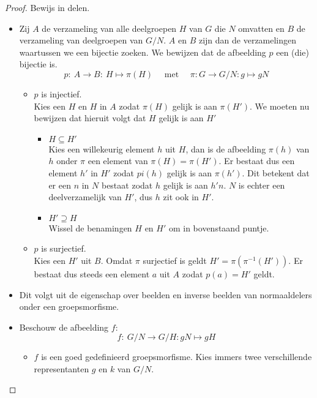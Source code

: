 \documentclass[main.tex]{subfiles}
\begin{document}
\begin{st}
  \begin{proof}
    Bewijs in delen.
    \begin{itemize}
    \item
      Zij $A$ de verzameling van alle deelgroepen $H$ van $G$ die $N$ omvatten en $B$ de verzameling van deelgroepen van $G/N$.
      $A$ en $B$ zijn dan de verzamelingen waartussen we een bijectie zoeken.
      We bewijzen dat de afbeelding $p$ een (die) bijectie is.
      \[ p:\ A \rightarrow B:\ H \mapsto \pi(H) \quad\text{ met }\quad \pi: G \rightarrow G/N: g \mapsto gN \]
      \begin{itemize}
      \item $p$ is injectief.\\
        Kies een $H$ en $H$ in $A$ zodat $\pi(H)$ gelijk is aan $\pi(H')$.
        We moeten nu bewijzen dat hieruit volgt dat $H$ gelijk is aan $H'$
        \begin{itemize}
        \item $H \subseteq H'$\\
          Kies een willekeurig element $h$ uit $H$, dan is de afbeelding $\pi(h)$ van $h$ onder $\pi$ een element van $\pi(H) = \pi(H')$.
          Er bestaat dus een element $h'$ in $H'$ zodat $pi(h)$ gelijk is aan $\pi(h')$.
          Dit betekent dat er een $n$ in $N$ bestaat zodat $h$ gelijk is aan $h'n$.
          $N$ is echter een deelverzamelijk van $H'$, dus $h$ zit ook in $H'$.
        \item $H' \supseteq H$\\
          Wissel de benamingen $H$ en $H'$ om in bovenstaand puntje.
        \end{itemize}
      \item $p$ is surjectief.\\
        Kies een $H'$ uit $B$.
        Omdat $\pi$ surjectief is geldt $H' = \pi(\pi^{-1}(H'))$.
        Er bestaat dus steeds een element $a$ uit $A$ zodat $p(a)=H'$ geldt. 
      \end{itemize}
    \item Dit volgt uit de eigenschap over beelden en inverse beelden van normaaldelers onder een groepsmorfisme. 
    \item Beschouw de afbeelding $f$:
      \[ f:\ G/N \rightarrow G/H: gN \mapsto gH \]
      \begin{itemize}
      \item 
        $f$ is een goed gedefinieerd groepsmorfisme.
        Kies immers twee verschillende representanten $g$ en $k$ van $G/N$.

\end{itemize}
\end{itemize}
\end{proof}
\end{st}
\end{document}

